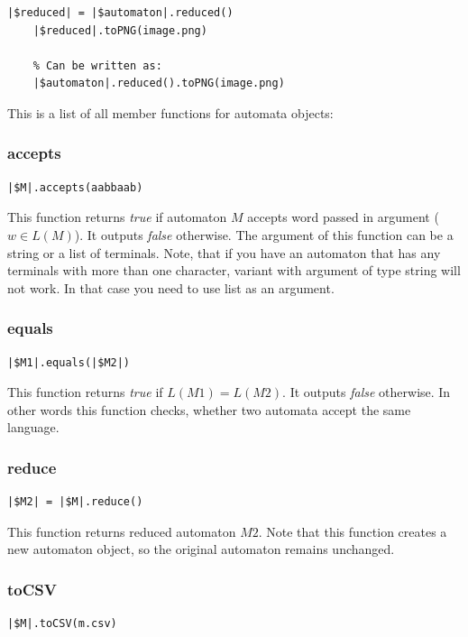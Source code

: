 \documentclass{ctuthesis}
\begin{document}
\begin{minipage}{\linewidth}
\begin{lstlisting}[language = JASL]
	|$reduced| = |$automaton|.reduced()
	|$reduced|.toPNG(image.png)
	
	% Can be written as:
	|$automaton|.reduced().toPNG(image.png)
\end{lstlisting}
\end{minipage}

This is a list of all member functions for automata objects:

\subsubsection{accepts}
\begin{lstlisting}[language = JASL_snippet]
	|$M|.accepts(aabbaab)
\end{lstlisting}

This function returns \textit{true} if automaton $M$ accepts word passed in argument ($w \in L(M)$). It outputs \textit{false} otherwise. The argument of this function can be a string or a list of terminals. Note, that if you have an automaton that has any terminals with more than one character, variant with argument of type string will not work. In that case you need to use list as an argument.

\subsubsection{equals}
\begin{lstlisting}[language = JASL_snippet]
	|$M1|.equals(|$M2|)
\end{lstlisting}

This function returns \textit{true} if $L(M1) = L(M2)$. It outputs \textit{false} otherwise. In other words this function checks, whether two automata accept the same language. 

\subsubsection{reduce}
\begin{lstlisting}[language = JASL_snippet]
	|$M2| = |$M|.reduce()
\end{lstlisting}

This function returns reduced automaton $M2$. Note that this function creates a new automaton object, so the original automaton remains unchanged.

\subsubsection{toCSV}
\begin{lstlisting}[language = JASL_snippet]
	|$M|.toCSV(m.csv)
\end{lstlisting}
\end{document}
